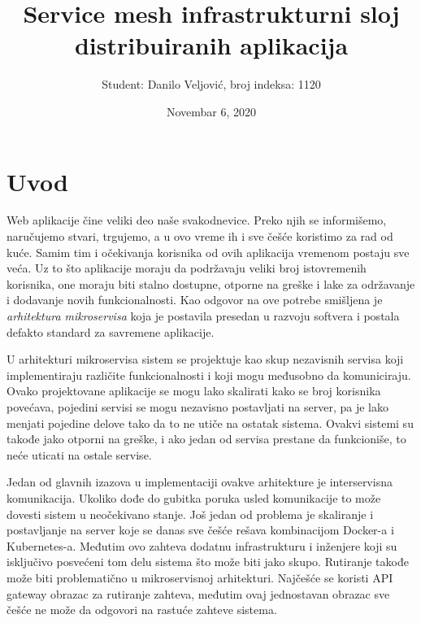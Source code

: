 \documentclass[a4paper,12pt]{report}
\begin{document}

\title{\Large{\textbf{Service mesh infrastrukturni sloj distribuiranih aplikacija }}}
\author{Student: Danilo Veljović, broj indeksa: 1120}
\date{Novembar 6, 2020}
\maketitle
\let\cleardoublepage\clearpage
\tableofcontents


\setcounter{page}{1}

\chapter{Uvod}

Web aplikacije čine veliki deo naše svakodnevice. Preko njih se informišemo, naručujemo stvari, trgujemo, a u ovo vreme ih i sve češće koristimo za rad od kuće. Samim tim i očekivanja korisnika od ovih aplikacija vremenom postaju sve veća. Uz to što aplikacije moraju da podržavaju veliki broj istovremenih korisnika, one moraju biti stalno dostupne, otporne na greške i lake za održavanje i dodavanje novih funkcionalnosti. Kao odgovor na ove potrebe smišljena je \textit{arhitektura mikroservisa} koja je postavila presedan u razvoju softvera i postala defakto standard za savremene aplikacije. \newline

U arhitekturi mikroservisa sistem se projektuje kao skup nezavisnih servisa koji implementiraju različite funkcionalnosti i koji mogu međusobno da komuniciraju.  Ovako projektovane aplikacije se mogu lako skalirati kako se broj korisnika povećava, pojedini servisi se mogu nezavisno postavljati na server, pa je lako menjati pojedine delove tako da to ne utiče na ostatak sistema. Ovakvi sistemi su takođe jako otporni na greške, i ako jedan od servisa prestane da funkcioniše, to neće uticati na ostale servise.  \newline

Jedan od glavnih izazova u implementaciji ovakve arhitekture je interservisna komunikacija. Ukoliko dođe do gubitka poruka usled komunikacije to može dovesti sistem u neočekivano stanje. Još jedan od problema je skaliranje i postavljanje na server koje se danas sve češće rešava kombinacijom Docker-a i Kubernetes-a. Međutim ovo zahteva dodatnu infrastrukturu i inženjere koji su isključivo posvećeni tom delu sistema što može biti jako skupo. Rutiranje takođe može biti problematično u mikroservisnoj arhitekturi. Najčešće se koristi API gateway obrazac za rutiranje zahteva, međutim ovaj jednostavan obrazac sve češće ne može da odgovori na rastuće zahteve sistema. \newline
\end{document}

